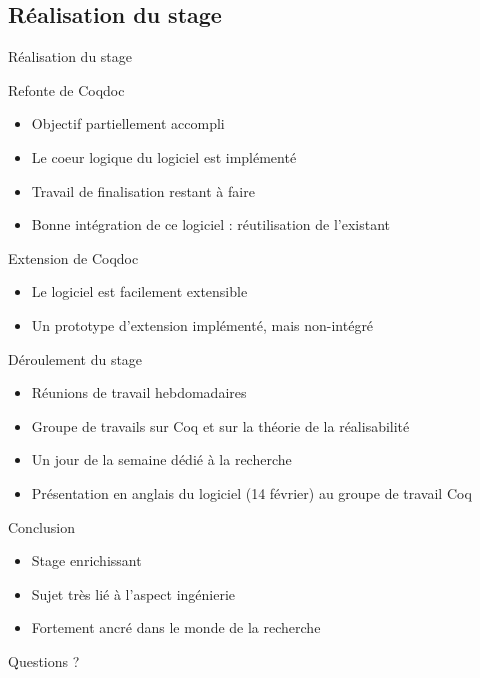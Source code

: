\documentclass[compress]{beamer}
\newenvironment{tframe}[1]{
  \subsection{#1}
  \begin{frame}{#1}
  }{
  \end{frame}
  }
\begin{document}
\begin{tframe}{Réalisation du stage}
  \begin{block}{Refonte de Coqdoc}
    \begin{itemize}
  \item Objectif partiellement accompli
  \item Le coeur logique du logiciel est implémenté
  \item Travail de finalisation restant à faire
  \item Bonne intégration de ce logiciel : réutilisation de l'existant
\end{itemize}
  \end{block}
  \begin{block}{Extension de Coqdoc}
    \begin{itemize}
      \item Le logiciel est facilement extensible
      \item Un prototype d'extension implémenté, mais non-intégré
    \end{itemize}
  \end{block}
\end{tframe}

\begin{frame}{Déroulement du stage}
  \begin{itemize}
    \item Réunions de travail hebdomadaires
    \item Groupe de travails sur Coq et sur la théorie de la réalisabilité
    \item Un jour de la semaine dédié à la recherche
    \item Présentation en anglais du logiciel (14 février) au groupe de travail
      Coq
  \end{itemize}
\end{frame}

\begin{frame}{Conclusion}
  \begin{itemize}
    \item Stage enrichissant
    \item Sujet très lié à l'aspect ingénierie
    \item Fortement ancré dans le monde de la recherche
  \end{itemize}
    \vfill
  \begin{center} \large Questions ? \end{center}
\end{frame}
\end{document}
